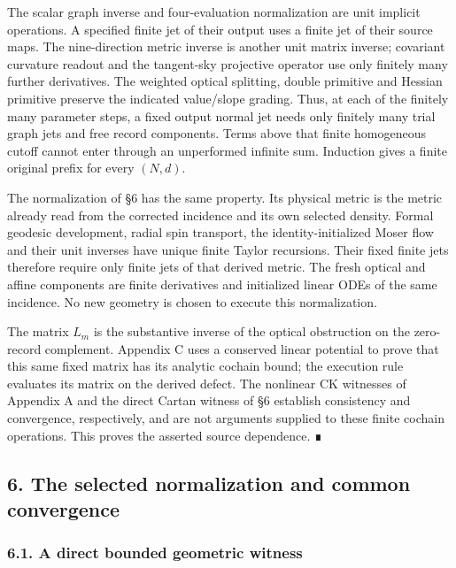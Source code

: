 \documentclass[
  english,
  11pt,
  reqno]{amsart}
\begin{document}
The scalar graph inverse and four-evaluation normalization are unit
implicit operations. A specified finite jet of their output uses a
finite jet of their source maps. The nine-direction metric inverse is
another unit matrix inverse; covariant curvature readout and the
tangent-sky projective operator use only finitely many further
derivatives. The weighted optical splitting, double primitive and
Hessian primitive preserve the indicated value/slope grading. Thus, at
each of the finitely many parameter steps, a fixed output normal jet
needs only finitely many trial graph jets and free record components.
Terms above that finite homogeneous cutoff cannot enter through an
unperformed infinite sum. Induction gives a finite original prefix for
every \((N,d)\).

The normalization of §6 has the same property. Its physical metric is
the metric already read from the corrected incidence and its own
selected density. Formal geodesic development, radial spin transport,
the identity-initialized Moser flow and their unit inverses have unique
finite Taylor recursions. Their fixed finite jets therefore require only
finite jets of that derived metric. The fresh optical and affine
components are finite derivatives and initialized linear ODEs of the
same incidence. No new geometry is chosen to execute this normalization.

The matrix \(L_m\) is the substantive inverse of the optical obstruction
on the zero-record complement. Appendix C uses a conserved linear
potential to prove that this same fixed matrix has its analytic cochain
bound; the execution rule evaluates its matrix on the derived defect.
The nonlinear CK witnesses of Appendix A and the direct Cartan witness
of §6 establish consistency and convergence, respectively, and are not
arguments supplied to these finite cochain operations. This proves the
asserted source dependence. ∎

\protect{}\label{sec:gg-common-convergence}

\subsection{6. The selected normalization and common
convergence}\label{the-selected-normalization-and-common-convergence}

\protect{}\label{sec:gg-bounded-witness}

\subsubsection{6.1. A direct bounded geometric
witness}\label{a-direct-bounded-geometric-witness}
\end{document}
